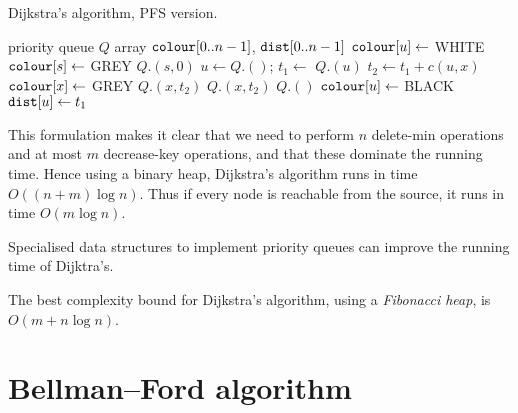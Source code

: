 \begin{algorithm}[H]
  \caption{Dijkstra's algorithm, PFS version.}
  \label{alg:dijkstra2}
\begin{algorithmic}[1]
	\State priority queue $Q$
	\State array $\colour[0..n-1]$, $\dist[0..n-1]$
		\State $\colour[u] \gets$ WHITE 
	\EndFor
	\State $\colour[s] \gets $ GREY
	\State $Q$.$(s, 0)$
		\State $u \gets Q$.$()$; $t_1 \gets$  $Q$.$(u)$
			\State $t_2 \gets t_1 + c(u, x)$
				\State $\colour[x] \gets $ GREY
				\State $Q$.$(x, t_2)$
				\State $Q$.$(x, t_2)$
			\EndIf
		\EndFor
		\State $Q$.$()$
		\State $\colour[u] \gets $ BLACK
		\State $\dist[u] \gets t_1$ 
	\EndWhile
	\State \Return{$\dist$}
\EndFunction
\end{algorithmic}
\end{algorithm}


This formulation makes it clear that we need to perform $n$
delete-min operations and at most $m$ decrease-key operations, and
that these dominate the running time. Hence using a binary heap, Dijkstra's
algorithm runs in time $O((n + m) \log n)$. Thus if every node is reachable 
from the source, it runs in time $O(m\log n)$.


Specialised data structures to implement priority queues can improve the running time of Dijktra's.

The best complexity bound for Dijkstra's algorithm, using a \emph{Fibonacci heap},
is $O(m + n\log n)$.



\section{Bellman--Ford algorithm} \label{sec:bellford}

